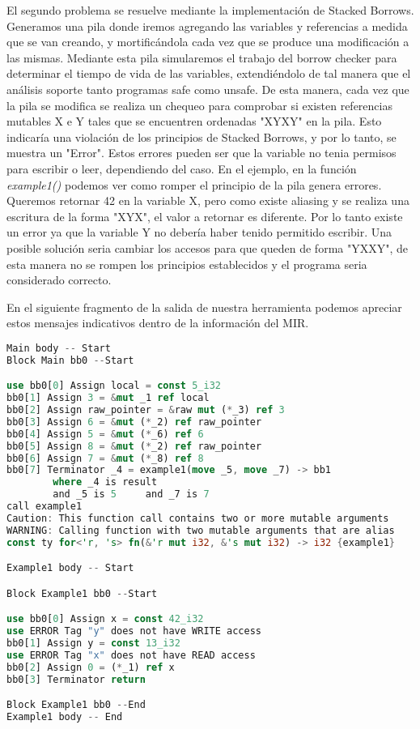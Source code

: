 El segundo problema se resuelve mediante la implementación de Stacked Borrows. Generamos una pila donde iremos agregando las variables y referencias
a medida que se van creando, y mortificándola cada vez que se produce una modificación a las mismas. Mediante esta pila simularemos el trabajo del
borrow checker para determinar el tiempo de vida de las variables, extendiéndolo de tal manera que el análisis soporte tanto programas safe como unsafe.
De esta manera, cada vez que la pila se modifica se realiza un chequeo para comprobar si existen referencias mutables X e Y tales que se encuentren
ordenadas "XYXY" en la pila. Esto indicaría una violación de los principios de Stacked Borrows, y por lo tanto, se muestra un "Error". Estos errores
pueden ser que la variable no tenia permisos para escribir o leer, dependiendo del caso.
En el ejemplo, en la función \textit{example1()} podemos ver como romper el principio de la pila genera errores. Queremos retornar 42 en la variable X,
pero como existe aliasing y se realiza una escritura de la forma "XYX", el valor a retornar es diferente. Por lo tanto existe un error ya que la variable
Y no debería haber tenido permitido escribir. Una posible solución seria cambiar los accesos para que queden de forma "YXXY", de esta manera no se rompen
los principios establecidos y el programa seria considerado correcto.

En el siguiente fragmento de la salida de nuestra herramienta podemos apreciar estos mensajes indicativos dentro de la información del MIR.

\begin{lstlisting}[language=Rust]
Main body -- Start
Block Main bb0 --Start

use bb0[0] Assign local = const 5_i32
bb0[1] Assign 3 = &mut _1 ref local
bb0[2] Assign raw_pointer = &raw mut (*_3) ref 3
bb0[3] Assign 6 = &mut (*_2) ref raw_pointer
bb0[4] Assign 5 = &mut (*_6) ref 6
bb0[5] Assign 8 = &mut (*_2) ref raw_pointer
bb0[6] Assign 7 = &mut (*_8) ref 8
bb0[7] Terminator _4 = example1(move _5, move _7) -> bb1
        where _4 is result
        and _5 is 5     and _7 is 7
call example1
Caution: This function call contains two or more mutable arguments
WARNING: Calling function with two mutable arguments that are alias
const ty for<'r, 's> fn(&'r mut i32, &'s mut i32) -> i32 {example1}

Example1 body -- Start

Block Example1 bb0 --Start

use bb0[0] Assign x = const 42_i32
use ERROR Tag "y" does not have WRITE access
bb0[1] Assign y = const 13_i32
use ERROR Tag "x" does not have READ access
bb0[2] Assign 0 = (*_1) ref x
bb0[3] Terminator return

Block Example1 bb0 --End
Example1 body -- End
\end{lstlisting}

